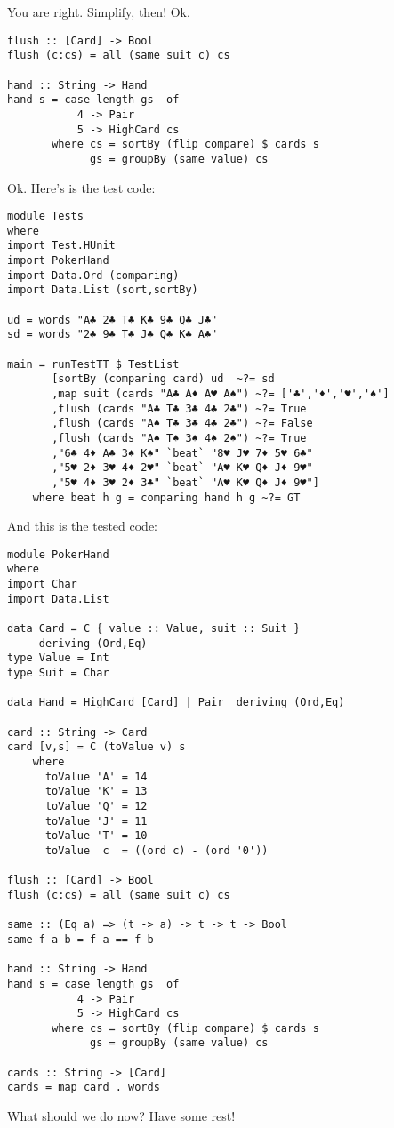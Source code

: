 \success You are right.
\newpage \lhN Simplify, then!
\lhA Ok. \begin{lstlisting}[frame=single]
flush :: [Card] -> Bool
flush (c:cs) = all (same suit c) cs

hand :: String -> Hand
hand s = case length gs  of
           4 -> Pair
           5 -> HighCard cs 
       where cs = sortBy (flip compare) $ cards s
             gs = groupBy (same value) cs
\end{lstlisting} %
\lhN Ok. Here's is the test code:
\begin{lstlisting}[frame=single]
module Tests
where 
import Test.HUnit
import PokerHand
import Data.Ord (comparing)
import Data.List (sort,sortBy)

ud = words "A♣ 2♣ T♣ K♣ 9♣ Q♣ J♣"
sd = words "2♣ 9♣ T♣ J♣ Q♣ K♣ A♣"

main = runTestTT $ TestList 
       [sortBy (comparing card) ud  ~?= sd
       ,map suit (cards "A♣ A♦ A♥ A♠") ~?= ['♣','♦','♥','♠']
       ,flush (cards "A♣ T♣ 3♣ 4♣ 2♣") ~?= True
       ,flush (cards "A♠ T♣ 3♣ 4♣ 2♣") ~?= False
       ,flush (cards "A♠ T♠ 3♠ 4♠ 2♠") ~?= True
       ,"6♣ 4♦ A♣ 3♠ K♠" `beat` "8♥ J♥ 7♦ 5♥ 6♣"
       ,"5♥ 2♦ 3♥ 4♦ 2♥" `beat` "A♥ K♥ Q♦ J♦ 9♥"
       ,"5♥ 4♦ 3♥ 2♦ 3♣" `beat` "A♥ K♥ Q♦ J♦ 9♥"]
    where beat h g = comparing hand h g ~?= GT
\end{lstlisting} %
\lhA \success And this is the tested code:
\begin{lstlisting}[frame=single]
module PokerHand
where
import Char
import Data.List

data Card = C { value :: Value, suit :: Suit } 
     deriving (Ord,Eq)
type Value = Int
type Suit = Char

data Hand = HighCard [Card] | Pair  deriving (Ord,Eq)

card :: String -> Card
card [v,s] = C (toValue v) s
    where 
      toValue 'A' = 14
      toValue 'K' = 13
      toValue 'Q' = 12
      toValue 'J' = 11
      toValue 'T' = 10
      toValue  c  = ((ord c) - (ord '0'))

flush :: [Card] -> Bool
flush (c:cs) = all (same suit c) cs

same :: (Eq a) => (t -> a) -> t -> t -> Bool
same f a b = f a == f b

hand :: String -> Hand
hand s = case length gs  of
           4 -> Pair
           5 -> HighCard cs 
       where cs = sortBy (flip compare) $ cards s
             gs = groupBy (same value) cs

cards :: String -> [Card]
cards = map card . words 
\end{lstlisting} %
\lhN What should we do now?
\lhA Have some rest!
\lhend


